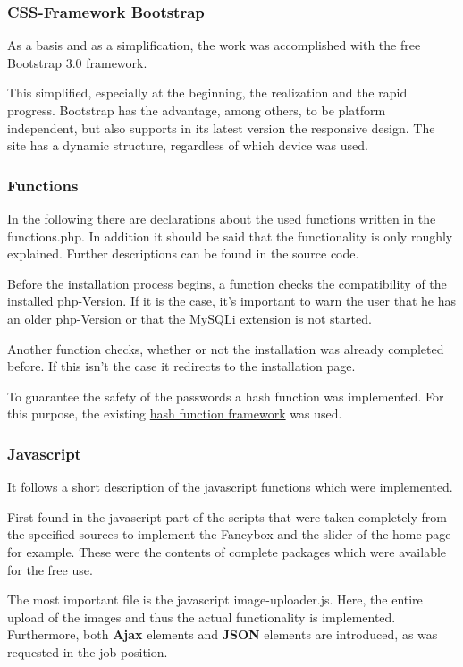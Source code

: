 \documentclass[a4paper,12pt,oneside]{article} %
\begin{document}
\subsubsection{CSS-Framework Bootstrap}

As a basis and as a simplification, the work was accomplished with the free Bootstrap 3.0 framework. 

This simplified, especially at the beginning, the realization and the rapid progress. 
Bootstrap has the advantage, among others, to be platform independent, but also supports in its 
latest version the \textquotedbl{}responsive design\textquotedbl{}. The site has a dynamic structure, 
regardless of which device was used.

\subsubsection{Functions}
In the following there are declarations about the used functions written in the functions.php.
In addition it should be said that the functionality is only roughly explained. Further descriptions can be found in the source code.

Before the installation process begins, a function checks the compatibility of the installed php-Version. If it is the case, it's important to warn the user that he has an older php-Version or that the MySQLi extension is not started. 

Another function checks, whether or not the installation was already completed before. If this isn't the case it redirects to the installation page. 

To guarantee the safety of the passwords a hash function was implemented. 
For this purpose, the existing \hyperlink{http://www.openwall.com/phpass/}{hash function framework}  was used. 

\subsubsection{Javascript}
It follows a short description of the javascript functions which were implemented. 

First found in the javascript part of the scripts that were taken completely from the specified sources to implement the Fancybox and the slider of the home page for example. These were the contents of complete packages which were available for the free use.

The most important file is the javascript image-uploader.js.
Here, the entire upload of the images and thus the actual functionality is implemented. Furthermore, both \textbf{Ajax} elements and \textbf{JSON}  elements are introduced, as was requested in the job position.
\end{document}
